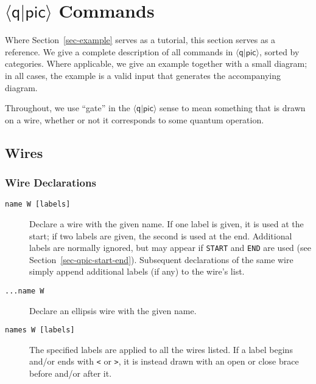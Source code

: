 \documentclass[twoside,12pt]{article}
\newcommand{\qpic}{$\langle\mathsf{q}|\mathsf{pic}\rangle$\xspace}
\begin{document}
\section{\qpic Commands}
\label{sec-qpic}

\lstset{basicstyle=\ttfamily\small,numbers=none}

Where Section~\ref{sec-example} serves as a tutorial, this section serves
as a reference.  We give a complete description of all commands in \qpic,
sorted by categories.  Where applicable, we give an example together with
a small diagram; in all cases, the example is a valid input that
generates the accompanying diagram.

Throughout, we use ``gate'' in the \qpic sense to mean
something that is drawn on a wire, whether or not it corresponds
to some quantum operation.

\subsection{Wires}
\subsubsection{Wire Declarations}
\label{sec-qpic-wire-name-rules}

\begin{description}
\item[{\tt name W [labels]}] Declare a wire with the given name.  If one label is
  given, it is used at the start; if two labels are given, the second is used at the
  end.  Additional labels are normally ignored, but may appear if {\tt START} and
  {\tt END} are used (see Section~\ref{sec-qpic-start-end}).  Subsequent declarations
  of the same wire simply append additional labels (if any) to the wire's list.

\begin{minipage}[b]{2in}

\end{minipage} \hfill 
\item[{\tt ...name W}] Declare an ellipsis wire with the given name.

\begin{minipage}[b]{2in}

\end{minipage} \hfill 

\item[{\tt names W [labels]}] The specified labels are applied to all the wires
  listed.  If a label begins and/or ends with {\tt <} or {\tt >}, it is instead
  drawn with an open or close brace before and/or after it.
  
\begin{minipage}[b]{2.7in}

\end{minipage} \hfill 
\end{description}
\end{document}

